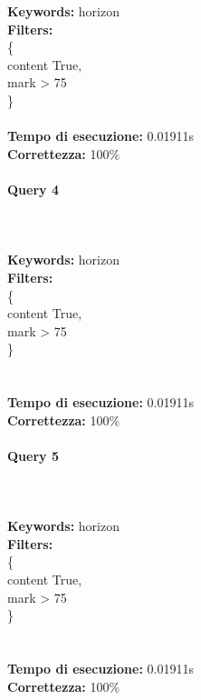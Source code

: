 \documentclass[12pt]{article}
\begin{document}
\noindent \textbf{Keywords: } horizon \\
\textbf{Filters: } \\
\indent \{ \\
\indent \indent content True, \\
\indent \indent mark > 75 \\
\indent \} \\\\


\textbf{Tempo di esecuzione:} 0.01911s \\
\textbf{Correttezza:} 100\% \pagebreak

\paragraph{Query 4} ~ \\ \\

\noindent \textbf{Keywords: } horizon \\
\textbf{Filters: } \\
\indent \{ \\
\indent \indent content True, \\
\indent \indent mark > 75 \\
\indent \} \\\\\\


\noindent
\textbf{Tempo di esecuzione:} 0.01911s \\
\textbf{Correttezza:} 100\% \pagebreak

\paragraph{Query 5} ~ \\ \\

\noindent \textbf{Keywords: } horizon \\
\textbf{Filters: } \\
\indent \{ \\
\indent \indent content True, \\
\indent \indent mark > 75 \\
\indent \} \\\\\\


\noindent
\textbf{Tempo di esecuzione:} 0.01911s \\
\textbf{Correttezza:} 100\% \pagebreak
\end{document}

